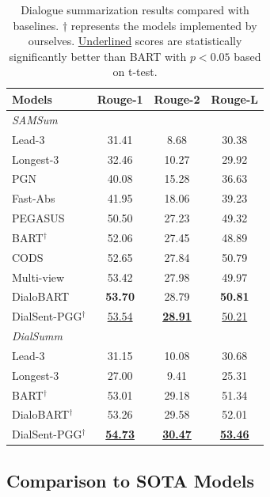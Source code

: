 \begin{table}[th]
	\scriptsize
	\centering
	\begin{tabular}{lccc}
		\toprule[1pt]
		\textbf{Models} & \textbf{Rouge-1} & \textbf{Rouge-2} & \textbf{Rouge-L} \\
		\midrule[1pt]
		\multicolumn{4}{l}{\textit{SAMSum}} \\
		{Lead-3} & 31.41& 8.68&30.38 \\
		{Longest-3} &32.46 &10.27 &29.92 \\
		{PGN} &40.08 &15.28 &36.63 \\
		{Fast-Abs} &41.95 &18.06 &39.23 \\
		{PEGASUS}& 50.50 & 27.23 & 49.32 \\
		{BART$^\dag$} &52.06 &27.45 &48.89 \\
		{CODS} &52.65 &27.84 &50.79 \\
		{Multi-view} & 53.42& 27.98& 49.97\\
		{DialoBART} &\textbf{53.70} &28.79 &\textbf{50.81} \\
		{DialSent-PGG$^\dag$} &\underline{53.54} &\textbf{\underline{28.91}} &\underline{50.21} \\
		\midrule[1pt]
		\multicolumn{4}{l}{\textit{DialSumm}} \\
		{Lead-3} &31.15 &10.08 &30.68\\
		{Longest-3} &27.00 &9.41 &25.31 \\
		{BART$^\dag$} & 53.01& 29.18& 51.34\\
		{DialoBART$^\dag$} &53.26 &29.58 &52.01 \\
		{DialSent-PGG$^\dag$} &\textbf{\underline{54.73}} &\textbf{\underline{30.47}} &\textbf{\underline{53.46}} \\
		\bottomrule[1pt]
	\end{tabular}
	\caption{Dialogue summarization results compared with baselines. $\dag$ represents the models implemented by ourselves. \underline{Underlined} scores are statistically significantly better than BART with $p<0.05$ based on t-test. }
	\label{tab:end2end}
\end{table}

\subsection{Comparison to SOTA Models}\label{sec:end2end}

